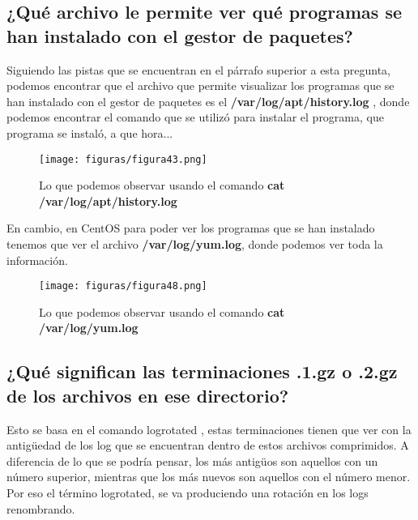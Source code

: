 \subsection{¿Qué archivo le permite ver qué programas se han instalado con el gestor de paquetes?}
Siguiendo las pistas que se encuentran en el párrafo superior a  esta pregunta, podemos encontrar que el archivo que permite visualizar los programas que se han instalado con el gestor de paquetes es el \textbf{/var/log/apt/history.log} , donde podemos encontrar el comando que se utilizó para instalar el programa, que programa se instaló, a que hora...
\begin{figure}[H] %
	\centering
	\texttt{[image: figuras/figura43.png]}  %
	\label{figura43}
	
	\caption{Lo que podemos observar usando el comando \textbf{cat /var/log/apt/history.log}} 
\end{figure}

En cambio, en CentOS para poder ver los programas que se han instalado tenemos que ver el archivo \textbf{/var/log/yum.log}, donde podemos ver toda la información.
\begin{figure}[H] %
	\centering
	\texttt{[image: figuras/figura48.png]}  %
	\label{figura48}
	
	\caption{Lo que podemos observar usando el comando \textbf{cat /var/log/yum.log}} 
\end{figure}
\subsection{¿Qué significan las terminaciones .1.gz o .2.gz de los archivos en ese directorio?}
Esto se basa en el comando logrotated \cite{logrotated}, estas terminaciones tienen que ver con la antigüedad de los log que se encuentran dentro de estos archivos comprimidos. A diferencia de lo que se podría pensar, los más antigüos son aquellos con un número superior, mientras que los más nuevos son aquellos con el número menor. Por eso el término logrotated, se va produciendo una rotación en los logs renombrando.

